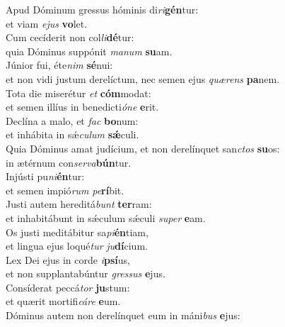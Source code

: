 \evenverse Apud Dóminum gressus hóminis di\textit{ri}\textbf{gén}tur:~\*\\
\evenverse et viam \textit{e}\textit{jus} \textbf{vo}let.\\
\oddverse Cum cecíderit non col\textit{li}\textbf{dé}tur:~\*\\
\oddverse quia Dóminus suppónit \textit{ma}\textit{num} \textbf{su}am.\\
\evenverse Júnior fui, éte\textit{nim} \textbf{sé}nui:~\*\\
\evenverse et non vidi justum derelíctum, nec semen ejus \textit{quæ}\textit{rens} \textbf{pa}nem.\\
\oddverse Tota die miserétur \textit{et} \textbf{cóm}modat:~\*\\
\oddverse et semen illíus in benedicti\textit{ó}\textit{ne} \textbf{e}rit.\\
\evenverse Declína a malo, et \textit{fac} \textbf{bo}num:~\*\\
\evenverse et inhábita in sǽ\textit{cu}\textit{lum} \textbf{sǽ}culi.\\
\oddverse Quia Dóminus amat judícium, et non derelínquet san\textit{ctos} \textbf{su}os:~\*\\
\oddverse in ætérnum con\textit{ser}\textit{va}\textbf{bún}tur.\\
\evenverse Injústi pu\textit{ni}\textbf{én}tur:~\*\\
\evenverse et semen impió\textit{rum} \textit{pe}\textbf{rí}bit.\\
\oddverse Justi autem hereditá\textit{bunt} \textbf{ter}ram:~\*\\
\oddverse et inhabitábunt in sǽculum sǽculi \textit{su}\textit{per} \textbf{e}am.\\
\evenverse Os justi meditábitur sa\textit{pi}\textbf{én}tiam,~\*\\
\evenverse et lingua ejus loqué\textit{tur} \textit{ju}\textbf{dí}cium.\\
\oddverse Lex Dei ejus in corde \textit{i}\textbf{psí}us,~\*\\
\oddverse et non supplantabúntur \textit{gres}\textit{sus} \textbf{e}jus.\\
\evenverse Consíderat peccá\textit{tor} \textbf{ju}stum:~\*\\
\evenverse et quærit mortifi\textit{cá}\textit{re} \textbf{e}um.\\
\oddverse Dóminus autem non derelínquet eum in máni\textit{bus} \textbf{e}jus:~\*\\
